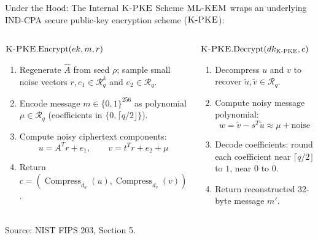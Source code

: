 \documentclass[aspectratio=169,11pt]{beamer}
\newcommand{\source}[1]{\par\vspace{-0.15cm}\hfill{\fontsize{4.5}{5.2}\selectfont\color{Slate!65}Source: NIST FIPS 203, #1.}}
\newcommand{\KEM}{\textsc{ML-KEM}}
\newcommand{\PKE}{\textsc{K-PKE}}
\begin{document}
\begin{frame}{Under the Hood: The Internal $\PKE$ Scheme}
  \small
  $\KEM$ wraps an underlying IND-CPA secure public-key encryption scheme ($\PKE$):
  \vspace{0.15cm}
  \begin{columns}[T,onlytextwidth]
      \begin{block}{$\PKE.\mathrm{Encrypt}(ek, m, r)$}
        \footnotesize
        \begin{enumerate}
          \setlength{\itemsep}{0.25em}
          \item Regenerate $\widehat A$ from seed $\rho$; sample small noise vectors $r, e_1 \in \mathcal{R}_q^k$ and $e_2 \in \mathcal{R}_q$.
          \item Encode message $m \in \{0,1\}^{256}$ as polynomial $\mu \in \mathcal{R}_q$ (coefficients in $\{0, \lceil q/2 \rfloor\}$).
          \item Compute noisy ciphertext components:
            \[
              u = A^T r + e_1, \qquad v = t^T r + e_2 + \mu
            \]
          \item Return $c = (\operatorname{Compress}_{d_u}(u), \operatorname{Compress}_{d_v}(v))$.
        \end{enumerate}
      \end{block}

      \begin{block}{$\PKE.\mathrm{Decrypt}(dk_{\PKE}, c)$}
        \footnotesize
        \begin{enumerate}
          \setlength{\itemsep}{0.25em}
          \item Decompress $u$ and $v$ to recover $\tilde{u}, \tilde{v} \in \mathcal{R}_q$.
          \item Compute noisy message polynomial:
            \[
              w = \tilde{v} - s^T \tilde{u} \approx \mu + \text{noise}
            \]
          \item Decode coefficients: round each coefficient near $\lceil q/2 \rfloor$ to $1$, near $0$ to $0$.
          \item Return reconstructed 32-byte message $m'$.
        \end{enumerate}
      \end{block}
  \end{columns}
  \source{Section 5}
\end{frame}
\end{document}
